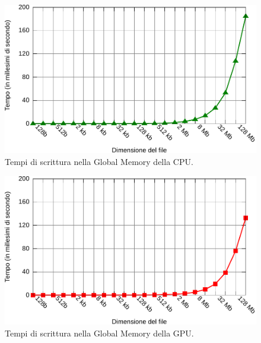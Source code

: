 \documentclass[12pt,a4paper,oneside]{book}
\begin{document}
\begin{figure}[p]
\begin{center}
\includegraphics[width=\textwidth]{img/test-write-cpu}
\caption{Tempi di scrittura nella Global Memory della CPU.\label{fig:test-write-cpu}}
\end{center}
\end{figure}

\begin{figure}[p]
\begin{center}
\includegraphics[width=\textwidth]{img/test-write-gpu}
\caption{Tempi di scrittura nella Global Memory della GPU.\label{fig:test-write-gpu}}
\end{center}
\end{figure}
\end{document}
